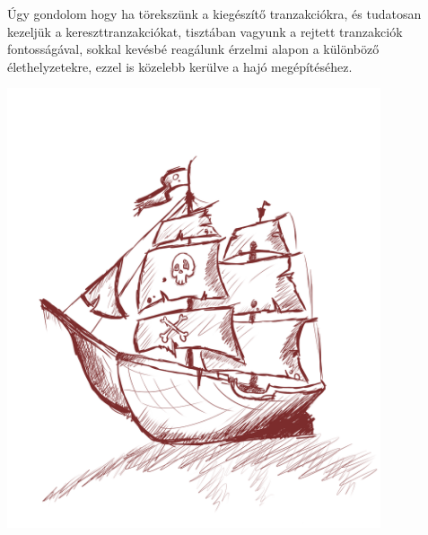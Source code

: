 \documentclass[a4paper,12pt]{article}
\begin{document}
	Úgy gondolom hogy ha törekszünk a kiegészítő tranzakciókra, és tudatosan kezeljük a kereszttranzakciókat, tisztában vagyunk a rejtett tranzakciók fontosságával, sokkal kevésbé reagálunk érzelmi alapon a különböző élethelyzetekre, ezzel is közelebb kerülve a hajó megépítéséhez.
	
	\begin{center}
		\includegraphics[width=11cm]{svgs/ship.png} \\[0.5cm]
	\end{center}
	
\end{document}

